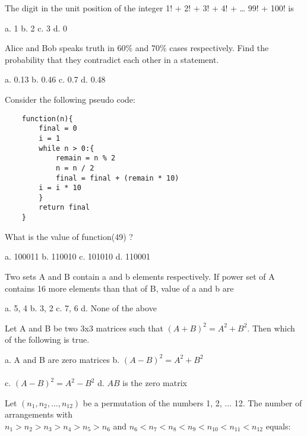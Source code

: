 \documentclass[a4paper, addpoints]{exam}
\begin{document}
\begin{questions}
	\question The digit in the unit position of the integer 1! + 2! + 3! + 4! + … 99! + 100! is \\
	
	\begin{oneparcheckboxes}
		\choice a. 1
		\choice b. 2
		\choice c. 3
		\choice d. 0
	\end{oneparcheckboxes}
	\question Alice and Bob speaks truth in 60\% and 70\% cases respectively. Find the probability that they contradict each other in a statement.\\
	
		\begin{oneparcheckboxes}
		\choice a. 0.13
		\choice b. 0.46
		\choice c. 0.7
		\choice d. 0.48
	\end{oneparcheckboxes}
	\question Consider the following pseudo code:
	\begin{verbatim}
	function(n){
		final = 0
		i = 1
		while n > 0:{
			remain = n % 2
			n = n / 2
			final = final + (remain * 10)
		i = i * 10
		}
		return final
	}
	\end{verbatim}
	What is the value of function(49) ? \\
	
	\begin{oneparcheckboxes}
		\choice a. 100011
		\choice b. 110010
		\choice c. 101010
		\choice d. 110001
	\end{oneparcheckboxes}
	
	\question Two sets A and B contain a and b elements respectively. If power set of A contains 16 more elements than that of B, value of a and b are\\

	\begin{oneparcheckboxes}
		\choice a. 5, 4
		\choice b. 3, 2
		\choice c. 7, 6
		\choice d. None of the above
	\end{oneparcheckboxes}
	\question Let A and B be two 3x3 matrices such that $(A+B)^2 = A^2 + B^2.$ Then which of the following is true.\\
	
	\begin{oneparcheckboxes}
		\choice a. A and B are zero matrices
		\choice b. $(A - B)^2 = A^2 + B^2$\\\\
		\choice c. $(A - B)^2 = A^2 - B^2$
		\choice d. $AB$ is the zero matrix
	\end{oneparcheckboxes}
	\question Let $(n_1, n_2, ... , n_{12})$ be a permutation of the numbers 1, 2, ... 12. The number of arrangements with \\ $n_1>n_2>n_3>n_4>n_5>n_6$  and  $n_6<n_7<n_8<n_9<n_{10}<n_{11}<n_{12}$ equals:\\
	

\end{questions}
\end{document}
